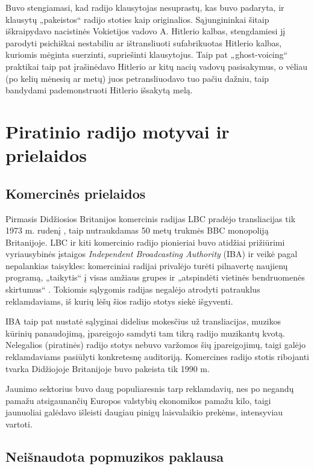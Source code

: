 \documentclass[kursinis-darbas]{vukf}
\begin{document}
Buvo stengiamasi, kad radijo klausytojas nesuprastų, kas buvo padaryta, ir klausytų „pakeistos“ radijo stoties kaip originalios. Sąjungininkai šitaip iškraipydavo nacistinės Vokietijos vadovo A. Hitlerio kalbas, stengdamiesi jį parodyti psichiškai nestabiliu ar ištransliuoti sufabrikuotas Hitlerio kalbas, kuriomis mėginta suerzinti, supriešinti klausytojus. Taip pat „ghost-voicing“ praktikai taip pat įrašinėdavo Hitlerio ar kitų nacių vadovų pasisakymus, o vėliau (po kelių mėnesių ar metų) juos petransliuodavo tuo pačiu dažniu, taip bandydami pademonstruoti Hitlerio išsakytą melą.


\section{Piratinio radijo motyvai ir prielaidos}

\subsection{Komercinės prielaidos}

Pirmasis Didžiosios Britanijos komercinis radijas LBC pradėjo transliacijas tik 1973 m. rudenį \cite{bbc_first_commercial_radio}, taip nutraukdamas 50 metų trukmės \gls{BBC} monopoliją Britanijoje. LBC ir kiti komercinio radijo pionieriai buvo atidžiai prižiūrimi vyriausybinės įstaigos \emph{Independent Broadcasting Authority} (IBA) ir veikė pagal nepalankias taisykles: komerciniai radijai privalėjo turėti pilnavertę naujienų programą, „taikytis“ į visas amžiaus grupes ir „atspindėti vietinės bendruomenės skirtumus“ \cite[p.~13]{cf_the_radio_handbook}. Tokiomis sąlygomis radijas negalėjo atrodyti patrauklus reklamdaviams, iš kurių lėšų šios radijo stotys siekė išgyventi.

IBA taip pat nustatė sąlyginai didelius mokesčius už transliacijas, muzikos kūrinių panaudojimą, įpareigojo samdyti tam tikrą radijo muzikantų kvotą. Nelegalios (piratinės) radijo stotys nebuvo varžomos šių įpareigojimų, taigi galėjo reklamdaviams pasiūlyti konkretesnę auditoriją. Komercines radijo stotis ribojanti tvarka Didžiojoje Britanijoje buvo pakeista tik 1990 m.

Jaunimo sektorius buvo daug populiaresnis tarp reklamdavių, nes po negandų pamažu atsigaunančių Europos valstybių ekonomikos pamažu kilo, taigi jaunuoliai galėdavo išleisti daugiau pinigų laisvalaikio prekėms, intensyviau vartoti.


\subsection{Neišnaudota popmuzikos paklausa}
\end{document}
